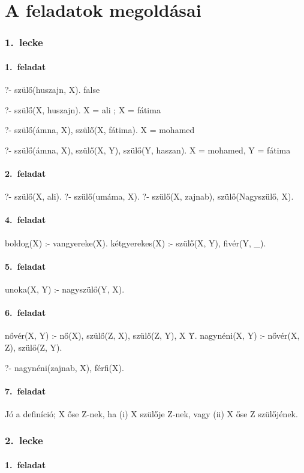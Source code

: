 \chapter{A feladatok megoldásai}
\subsection*{1.~lecke}
\subsubsection*{1.~feladat}
\begin{query}
?- szülő(huszajn, X).
false

?- szülő(X, huszajn).
X = ali ;
X = fátima

?- szülő(ámna, X), szülő(X, fátima).
X = mohamed

?- szülő(ámna, X), szülő(X, Y), szülő(Y, haszan).
X = mohamed,
Y = fátima
\end{query}
\subsubsection*{2.~feladat}
\begin{query}
?- szülő(X, ali).
?- szülő(umáma, X).
?- szülő(X, zajnab), szülő(Nagyszülő, X).
\end{query}
\subsubsection*{4.~feladat}
\begin{program}
boldog(X) :- vangyereke(X).
kétgyerekes(X) :- szülő(X, Y), fivér(Y, _).
\end{program}
\subsubsection*{5.~feladat}
\begin{program}
unoka(X, Y) :- nagyszülő(Y, X).
\end{program}
\subsubsection*{6.~feladat}
\begin{program}
nővér(X, Y) :-
    nő(X),
    szülő(Z, X), szülő(Z, Y),
    X \= Y.
nagynéni(X, Y) :- nővér(X, Z), szülő(Z, Y).
\end{program}
\begin{query}
?- nagynéni(zajnab, X), férfi(X).
\end{query}
\subsubsection*{7.~feladat}
Jó a definíció; X őse Z-nek, ha (i) X szülője Z-nek, vagy (ii) X őse Z szülőjének.
\subsection*{2.~lecke}
\subsubsection*{1.~feladat}
